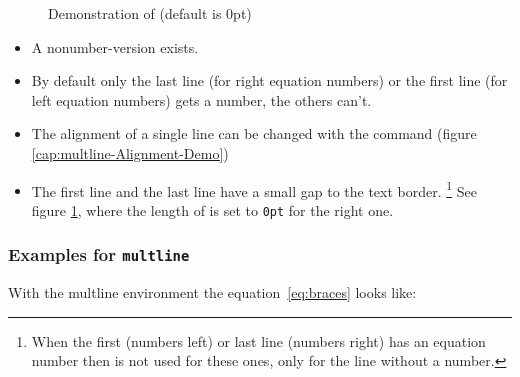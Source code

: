 \begin{table}[htb]
\begin{figure}[htb]
\begin{minipage}[c]{0.45\textwidth}%
\end{minipage}%
\hfill{}\begin{minipage}[c]{0.45\textwidth}%
{\setlength{\multlinegap}{0pt}}
\end{minipage}%
\caption{\label{cap:multlinegap}Demonstration of  (default is 0pt)}
\end{figure}



\begin{itemize}
\item A nonumber-version 
exists.
\item By default only the last line (for right equation numbers) or the
first line (for left equation numbers) gets a number, the others can't.
\item The alignment of a single line can be changed with the command
 (figure \vref{cap:multline-Alignment-Demo})
\item The first line and the last line have a small gap to the text border.%
\footnote{When the first (numbers left) or last line (numbers right) has an
equation number then  is not used
for these ones, only for the line without a number.} See figure \ref{cap:multlinegap}, where the length of 
is set to \texttt{0pt} for the right one.
\end{itemize}

\subsubsection{Examples for \texttt{multline}}\label{sec:Specials-for-multline}

With the multline environment the equation~\vref{eq:braces} looks like:


\end{table}
